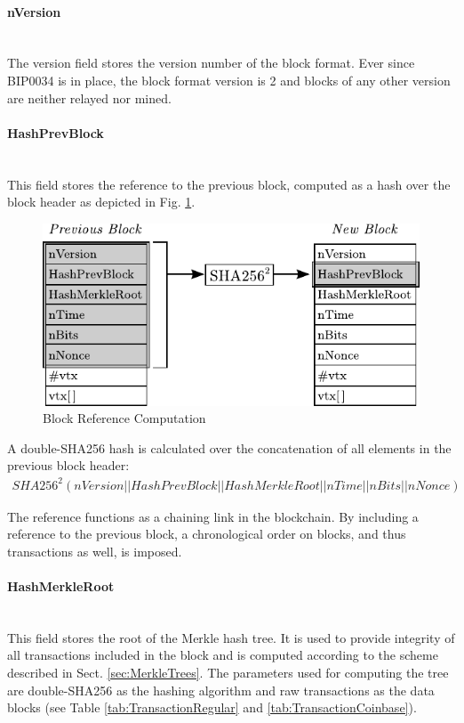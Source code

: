 \vspace{-30pt}
\clearpage

\paragraph{nVersion}~\\
The version field stores the version number of the block format. Ever since BIP0034 \cite{BIP0034} is in place, the block format version is 2 and blocks of any other version are neither relayed nor mined.

\paragraph{HashPrevBlock}~\\
This field stores the reference to the previous block, computed as a hash over the block header as depicted in Fig. \ref{fig:HashPrevBlock}.
\begin{figure}[ht!]
 \centering
 \includegraphics[scale=1]{Images/HashPrevBlock.pdf}
 \caption{Block Reference Computation} \label{fig:HashPrevBlock}
\end{figure}

\noindent
A double-SHA256 hash is calculated over the concatenation of all elements in the previous block header:
\begin{equation}
\begin{aligned}
SHA256^{2}(nVersion||HashPrevBlock||HashMerkleRoot||nTime||nBits||nNonce)
\label{eqn:HashPrevBlock}
\end{aligned}
\end{equation}

\noindent
The reference functions as a chaining link in the blockchain. By including a reference to the previous block, a chronological order on blocks, and thus transactions as well, is imposed.


\paragraph{HashMerkleRoot}~\\
This field stores the root of the Merkle hash tree. It is used to provide integrity of all transactions included in the block and is computed according to the scheme described in Sect. \ref{sec:MerkleTrees}. The parameters used for computing the tree are double-SHA256 as the hashing algorithm and raw transactions as the data blocks (see Table \ref{tab:TransactionRegular} and \ref{tab:TransactionCoinbase}).


